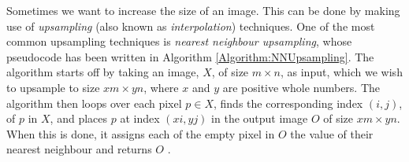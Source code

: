 \documentclass[./main.tex]{subfiles}
\begin{document}
Sometimes we want to increase the size of an image. This can be done by making use of \textit{upsampling} (also known as \textit{interpolation}) techniques. One of the most common upsampling techniques is \textit{nearest neighbour upsampling}, whose pseudocode has been written in Algorithm \ref{Algorithm:NNUpsampling}. The algorithm starts off by taking an image, $X$, of size $m \times n$, as input, which we wish to upsample to size $xm \times yn$, where $x$ and $y$ are positive whole numbers. The algorithm then loops over each pixel $p \in X$, finds the corresponding index $(i, j)$, of $p$ in $X$, and places $p$ at index $(xi, yj)$ in the output image $O$ of size $xm \times yn$. When this is done, it assigns each of the empty pixel in $O$ the value of their nearest neighbour and returns $O$ \cite{NNUpsampling}.
\end{document}
